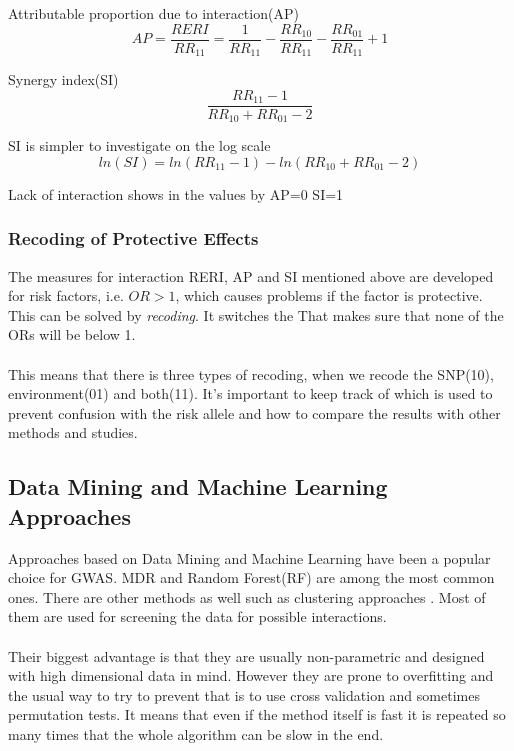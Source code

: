 \documentclass[10pt,a4paper]{report}
\begin{document}
Attributable proportion due to interaction(AP)
\begin{equation}
AP=\frac{RERI}{RR_{11}}=\frac{1}{RR_{11}}-\frac{RR_{10}}{RR_{11}}-\frac{RR_{01}}{RR_{11}}+1
\end{equation}

Synergy index(SI)
\begin{equation}
\frac{RR_{11}-1}{RR_{10}+RR_{01}-2}
\end{equation}

SI is simpler to investigate on the log scale
\begin{equation}
ln(SI)=ln(RR_{11}-1)-ln(RR_{10}+RR_{01}-2)
\end{equation}

Lack of interaction shows in the values by
AP=0
SI=1
\cite{recoding_2011}

\subsubsection{Recoding of Protective Effects}
The measures for interaction RERI, AP and SI mentioned above are developed for risk factors, i.e. $OR>1$, which causes problems if the factor is protective. This can be solved by \emph{recoding}. It switches the %
That makes sure that none of the ORs will be below 1.\\
\\
This means that there is three types of recoding, when we recode the SNP(10), environment(01) and both(11). It's important to keep track of which is used to prevent confusion with the risk allele and how to compare the results with other methods and studies.

\cite{recoding_2011}

\subsection{Data Mining and Machine Learning Approaches}
\label{data_machine_learning}
Approaches based on Data Mining and Machine Learning have been a popular choice for GWAS. MDR\cite{mdr_2001} and Random Forest(RF)\cite{random_forest} are among the most common ones\cite{gene_enviroment_2013,cordell_detect_review}. There are other methods as well such as clustering approaches \cite{fast_high_order_cluster}. Most of them are used for screening the data for possible interactions\cite{gene_enviroment_2013,cordell_detect_review}.\\
\\
Their biggest advantage is that they are usually non-parametric and designed with high dimensional data in mind. However they are prone to overfitting and the usual way to try to prevent that is to use cross validation and sometimes permutation tests. It means that even if the method itself is fast it is repeated so many times that the whole algorithm can be slow in the end.\cite{cordell_detect_review}
\end{document}

